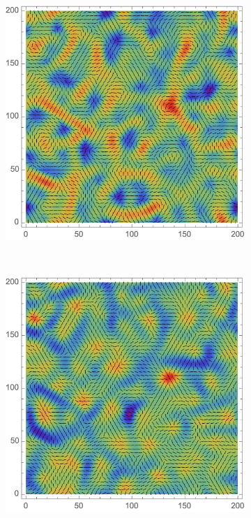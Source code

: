 \documentclass[a4paper, 11pt]{article}
\begin{document}
\begin{figure}
\begin{subfigure}[b]{0.49\textwidth}
\end{subfigure}\\
\begin{subfigure}[b]{0.49\textwidth}
\includegraphics[width=\textwidth]{Lambda_1}
\end{subfigure}~
\begin{subfigure}[b]{0.49\textwidth}
\includegraphics[width=\textwidth]{Lambda_2}

\end{subfigure}
\end{figure}
\end{document}
